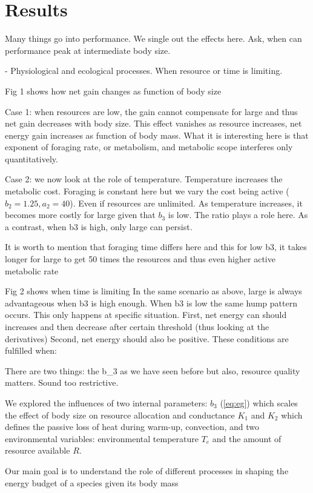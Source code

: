 \section*{Results}
 Many things go into performance. We  single out the effects here.
 Ask, when can performance peak at intermediate body size.

- Physiological and ecological processes.
When resource or time is limiting.

Fig 1 shows how net gain changes as function of body size

 Case 1: when resources are low, the gain cannot compensate for large and thus net gain decreases with body size. 
 This effect vanishes as resource increases, net energy gain increases as function of body mass.
 What it is interesting here is that exponent of foraging rate, or metabolism, and metabolic scope interferes only quantitatively. 
 
 Case 2: we now look at the role of temperature.
 Temperature increases the metabolic cost.
 Foraging is constant here but we vary the cost being active ($b_2 = 1.25, a_2 = 40$).
 Even if resources are unlimited.
 As temperature increases, it becomes more costly for large given that $b_3$ is low. 
 The ratio plays a role here.
 As a contrast, when b3 is high, only large can persist. 

 It is worth to mention that foraging time differs here and this for low b3, it takes longer for large to get 50 times the resources and thus even higher active metabolic rate   
 
 Fig 2 shows when time is limiting
 In the same scenario as above, large is always advantageous when b3 is high enough.
 When b3 is low the same hump pattern occurs.
This only happens at specific situation.
First, net energy can should increases and then decrease after certain threshold (thus looking at the derivatives)
Second, net energy should also be positive.
These conditions are fulfilled when: 

 There are two things: the b_3 as we have seen before but also, resource quality matters.
 Sound too restrictive. 
 

We explored the influences of two internal parameters: $b_3$ (\cref{eq:eg}) which scales the effect of body size on resource allocation and conductance $K_1$ and $K_2$ which defines the passive loss of heat during warm-up, convection, and two environmental variables: environmental temperature $T_e$ and the amount of resource available $R$.

Our main goal is to understand the role of different processes in shaping the energy budget of a species given its body mass

